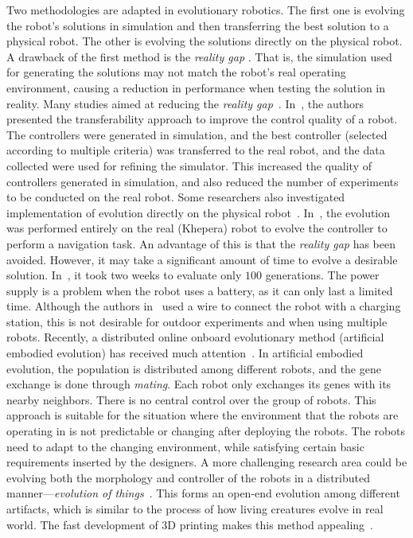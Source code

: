 Two methodologies are adapted in evolutionary robotics. The first one is evolving the robot's solutions in simulation and then transferring the best solution to a physical robot. The other is evolving the solutions directly on the physical robot. A drawback of the first method is the \textit{reality gap} \cite{Jakobi95}. That is, the simulation used for generating the solutions may not match the robot's real operating environment, causing a reduction in performance when testing the solution in reality. Many studies aimed at reducing the \textit{reality gap}~\cite{Koos:TEVC:2013, Koos:IJRR:2013, Alan:2014}. In~\cite{Koos:TEVC:2013, Koos:IJRR:2013}, the authors presented the transferability approach to improve the control quality of a robot. The controllers were generated in simulation, and the best controller (selected according to multiple criteria) was transferred to the real robot, and the data collected were used for refining the simulator. This increased the quality of controllers generated in simulation, and also reduced the number of experiments to be conducted on the real robot. Some researchers also investigated implementation of evolution directly on the physical robot~\cite{Floreano1996, hornby1999autonomous, Zykov2004}. In~\cite{Floreano1996}, the evolution was performed entirely on the real (Khepera) robot to evolve the controller to perform a navigation task. An advantage of this is that the \textit{reality gap} has been avoided. However, it may take a significant amount of time to evolve a desirable solution. In~\cite{Floreano1996}, it took two weeks to evaluate only $100$ generations. The power supply is a problem when the robot uses a battery, as it can only last a limited time. Although the authors in~\cite{Floreano1996} used a wire to connect the robot with a charging station, this is not desirable for outdoor experiments and when using multiple robots. Recently, a distributed online onboard evolutionary method (artificial embodied evolution) has received much attention~\cite{Watson2012, eiben:inria-00531455, Eiben:EI:2012, eiben2013triangle}. In artificial embodied evolution, the population is distributed among different robots, and the gene exchange is done through \textit{mating}. Each robot only exchanges its genes with its nearby neighbors. There is no central control over the group of robots. This approach is suitable for the situation where the environment that the robots are operating in is not predictable or changing after deploying the robots. The robots need to adapt to the changing environment, while satisfying certain basic requirements inserted by the designers. A more challenging research area could be evolving both the morphology and controller of the robots in a distributed manner---\textit{evolution of things}~\cite{Eiben:2014:PPSN, Eiben:Nature:2015}. This forms an open-end evolution among different artifacts, which is similar to the process of how living creatures evolve in real world. The fast development of 3D printing makes this method appealing~\cite{Tumbleston20032015}. 

